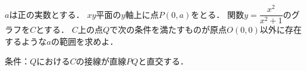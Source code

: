 \documentclass[../../main.tex]{subfiles}
\begin{document}
$a$は正の実数とする．
$xy$平面の$y$軸上に点$P(0,a)$をとる．
関数$\displaystyle y=\dfrac{x^2}{x^2+1}$のグラフを$C$とする．
$C$上の点$Q$で次の条件を満たすものが原点$O(0,0)$以外に存在するような$a$の範囲を求めよ．

条件：$Q$における$C$の接線が直線$PQ$と直交する．
\end{document}
